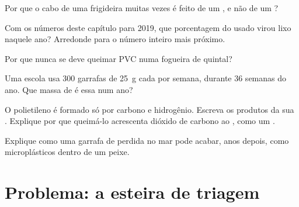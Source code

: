 \begin{exercise}[$\star\star$]\label{exo:g8:plastics:7}
Por que o cabo de uma frigideira muitas vezes é feito de um , e
não de um ?
\end{exercise}

\begin{exercise}[$\star\star$]\label{exo:g8:plastics:8}
Com os números deste capítulo para 2019, que porcentagem do 
usado virou lixo naquele ano? Arredonde para o número inteiro mais
próximo.
\end{exercise}

\begin{exercise}[$\star\star$]\label{exo:g8:plastics:9}
Por que nunca se deve queimar PVC numa fogueira de quintal?
\end{exercise}

\begin{exercise}[$\star\star$]\label{exo:g8:plastics:10}
Uma escola usa 300 garrafas de \qty{25}{g} cada por semana, durante 36
semanas do ano. Que massa de  é essa num ano?
\end{exercise}

\begin{exercise}[$\star\star\star$]\label{exo:g8:plastics:11}
O polietileno é formado só por carbono e hidrogênio. Escreva os produtos
da sua . Explique por que queimá-lo acrescenta
dióxido de carbono ao , como um .
\end{exercise}

\begin{exercise}[$\star\star\star$]\label{exo:g8:plastics:12}
Explique como uma garrafa de  perdida no mar pode acabar, anos
depois, como microplásticos dentro de um peixe.
\end{exercise}

\section{Problema: a esteira de triagem}

